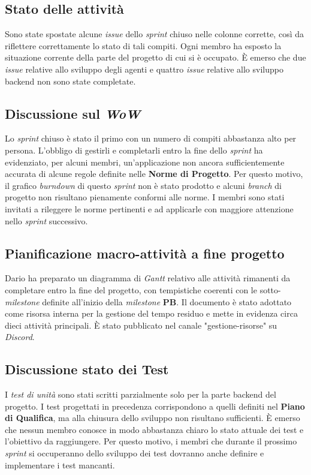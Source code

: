 \documentclass[12pt, a4paper]{article}
\begin{document}
\subsection{Stato delle attività}
Sono state spostate alcune \textit{issue} dello \textit{sprint} chiuso nelle colonne corrette, così da riflettere correttamente lo stato di tali compiti. Ogni membro ha esposto la situazione corrente della parte del progetto di cui si è occupato. È emerso che due \textit{issue} relative allo sviluppo degli agenti e quattro \textit{issue} relative allo sviluppo backend non sono state completate.

\subsection{Discussione sul \textit{WoW}}
Lo \textit{sprint} chiuso è stato il primo con un numero di compiti abbastanza alto per persona. L'obbligo di gestirli e completarli entro la fine dello \textit{sprint} ha evidenziato, per alcuni membri, un'applicazione non ancora sufficientemente accurata di alcune regole definite nelle \textbf{Norme di Progetto}. Per questo motivo, il grafico \textit{burndown} di questo \textit{sprint} non è stato prodotto e alcuni \textit{branch} di progetto non risultano pienamente conformi alle norme. I membri sono stati invitati a rileggere le norme pertinenti e ad applicarle con maggiore attenzione nello \textit{sprint} successivo.

\subsection{Pianificazione macro-attività a fine progetto}
Dario ha preparato un diagramma di \textit{Gantt} relativo alle attività rimanenti da completare entro la fine del progetto, con tempistiche coerenti con le sotto-\textit{milestone} definite all'inizio della \textit{milestone} \textbf{PB}. Il documento è stato adottato come risorsa interna per la gestione del tempo residuo e mette in evidenza circa dieci attività principali. È stato pubblicato nel canale "gestione-risorse" su \textit{Discord}.

\subsection{Discussione stato dei Test}
I \textit{test di unità} sono stati scritti parzialmente solo per la parte backend del progetto. I test progettati in precedenza corrispondono a quelli definiti nel \textbf{Piano di Qualifica}, ma alla chiusura dello sviluppo non risultano sufficienti. È emerso che nessun membro conosce in modo abbastanza chiaro lo stato attuale dei test e l'obiettivo da raggiungere. Per questo motivo, i membri che durante il prossimo \textit{sprint} si occuperanno dello sviluppo dei test dovranno anche definire e implementare i test mancanti.
\end{document}
